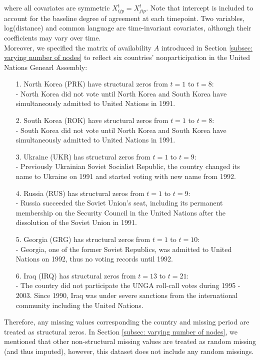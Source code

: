 \documentclass[a4paper]{article}
\begin{document}
where all covariates are symmetric $X^t_{ijp}=X^t_{jip}$. Note that intercept is included to account for the baseline degree of agreement at each timepoint. Two variables,  log($\mbox{distance}$) and common language are time-invariant covariates, although their coefficients may vary over time.\\\newline
Moreover, we specified the matrix of availability $A$ introduced in Section \ref{subsec: varying number of nodes} to reflect six countries' nonparticipation in the United Nations Genearl Assembly: 
\begin{itemize}
	\item[1.]  North Korea (PRK) have structural zeros from $t = 1$ to $t = 8$:\\
	- North Korea did not vote until North Korea and South Korea have simultaneously admitted to United Nations in 1991.
	\item[2.] South Korea (ROK) have structural zeros from $t = 1$ to $t = 8$:\\
	- South Korea did not vote until North Korea and South Korea have simultaneously admitted to United Nations in 1991.
	\item [3.] Ukraine (UKR)  has structural zeros from $t=1$ to $t = 9$: \\
	- Previously Ukrainian Soviet Socialist Republic, the country changed its name to Ukraine on 1991 and started voting with new name from 1992.
	\item [4.] Russia (RUS) has structural zeros from $t=1$ to $t =9$:\\
- Russia succeeded the Soviet Union's seat, including its permanent membership on the Security Council in the United Nations after the dissolution of the Soviet Union in 1991. 
	\item [5.] Georgia (GRG) has structural zeros from $t = 1$ to $t = 10$:\\
	-  Georgia, one of the former Soviet Republics, was admitted to United Nations on 1992, thus no voting records until 1992.
	\item [6.] Iraq (IRQ) has structural zeros from $t = 13$ to $t = 21$:\\
	- The country did not participate the UNGA roll-call votes during 1995 - 2003. Since 1990, Iraq was under severe sanctions from the international community including the United Nations.
\end{itemize}
Therefore, any missing values corresponding the country and missing period are treated as structural zeros. In Section \ref{subsec: varying number of nodes}, we mentioned that other non-structural missing values are treated as random missing (and thus imputed), however, this dataset does not include any random missings. 
\end{document}
